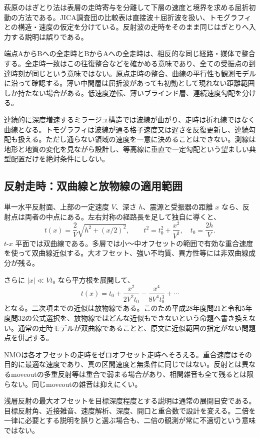 萩原のはぎとり法は表層の走時寄与を分離して下層の速度と境界を求める屈折初動の方法である。JICA調査団の比較表は直接波＋屈折波を扱い、トモグラフィとの構造・速度の仮定を分けている\cite{jica_refraction2015}。反射波の走時をそのまま同じはぎとりへ入力する説明は誤りである。

端点AからBへの全走時とBからAへの全走時は、相反的な同じ経路・媒体で整合する。全走時一致はこの往復整合などを確かめる意味であり、全ての受振点の到達時刻が同じという意味ではない。原点走時の整合、曲線の平行性も観測モデルに沿って確認する。薄い中間層は屈折波があっても初動として現れない距離範囲しか持たない場合がある。低速度逆転、薄いブラインド層、連続速度勾配を分ける\cite{usgs_refraction2013}。

連続的に深度増速するミラージュ構造では波線が曲がり、走時は折れ線ではなく曲線となる。トモグラフィは波線が通る格子速度又は遅さを反復更新し、連続勾配も扱える。ただし通らない領域の速度を一意に決めることはできない。測線は地形と地質の変化を見ながら設計し、等高線に垂直で一定勾配という望ましい典型配置だけを絶対条件にしない。

\subsection{反射走時：双曲線と放物線の適用範囲}
\label{theory:exploration:reflectiongeometry}
単一水平反射面、上部の一定速度 \(V\)、深さ \(h\)、震源と受振器の距離 \(x\) なら、反射点は両者の中点にある。左右対称の経路長を足して独自に導くと、
\[
 t(x)=\frac{2}{V}\sqrt{h^2+(x/2)^2},\qquad
 t^2=t_0^2+\frac{x^2}{V^2},\quad t_0=\frac{2h}{V}.
\]
\(t\)-\(x\) 平面では双曲線である。多層では小〜中オフセットの範囲で有効な重合速度を使って双曲線近似する。大オフセット、強い不均質、異方性等には非双曲線成分が残る。

さらに \(|x|\ll Vt_0\) なら平方根を展開して、
\[
 t(x)=t_0+\frac{x^2}{2V^2t_0}
 -\frac{x^4}{8V^4t_0^3}+\cdots
\]
となる。二次項までの近似は放物線である。このため平成28年度問21と令和5年度問32の公式選択を、放物線ではどんな近似もできないという命題へ書き換えない。通常の走時モデルが双曲線であることと、原文に近似範囲の指定がない問題点を併記する。

NMOは各オフセットの走時をゼロオフセット走時へそろえる。重合速度はその目的に最適な速度であり、真の区間速度と無条件に同じではない\cite{usgs_processing2000}。反射とは異なるmoveoutの多重反射等は重合で弱まる場合があり、相関雑音も全て残るとは限らない。同じmoveoutの雑音は抑えにくい。

浅層反射の最大オフセットを目標深度程度とする説明は通常の展開目安である\cite{coastal_reflection2016}。目標反射角、近接雑音、速度解析、深度、開口と重合数で設計を変える。二倍を一律に必要とする説明を誤りと選ぶ場合も、二倍の観測が常に不適切という意味ではない。

